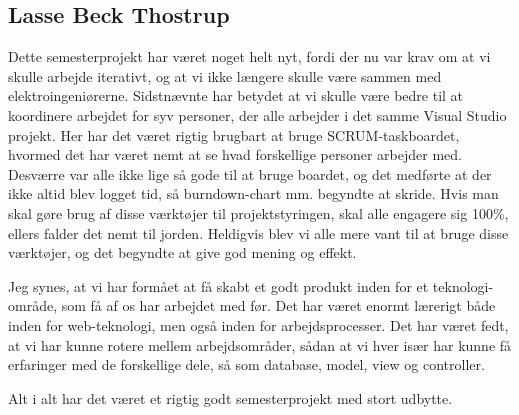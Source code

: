 \subsection*{Lasse Beck Thostrup}

Dette semesterprojekt har været noget helt nyt, fordi der nu var krav om at vi skulle arbejde iterativt, og at vi ikke længere skulle være sammen med elektroingeniørerne. Sidstnævnte har betydet at vi skulle være bedre til at koordinere arbejdet for syv personer, der alle arbejder i det samme Visual Studio projekt. Her har det været rigtig brugbart at bruge SCRUM-taskboardet, hvormed det har været nemt at se hvad forskellige personer arbejder med. Desværre var alle ikke lige så gode til at bruge boardet, og det medførte at der ikke altid blev logget tid, så burndown-chart mm. begyndte at skride. Hvis man skal gøre brug af disse værktøjer til projektstyringen, skal alle engagere sig 100\%, ellers falder det nemt til jorden. Heldigvis blev vi alle mere vant til at bruge disse værktøjer, og det begyndte at give god mening og effekt.

Jeg synes, at vi har formået at få skabt et godt produkt inden for et teknologi-område, som få af os har arbejdet med før. Det har været enormt lærerigt både inden for web-teknologi, men også inden for arbejdsprocesser. Det har været fedt, at vi har kunne rotere mellem arbejdsområder, sådan at vi hver især har kunne få erfaringer med de forskellige dele, så som database, model, view og controller.

Alt i alt har det været et rigtig godt semesterprojekt med stort udbytte.